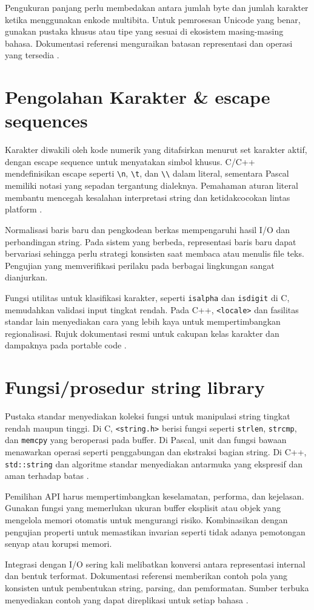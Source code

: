 \documentclass[../main.tex]{subfiles}
\begin{document}
Pengukuran panjang perlu membedakan antara jumlah byte dan jumlah karakter ketika menggunakan enkode multibita. Untuk pemrosesan Unicode yang benar, gunakan pustaka khusus atau tipe yang sesuai di ekosistem masing-masing bahasa. Dokumentasi referensi menguraikan batasan representasi dan operasi yang tersedia \parencite{cpp-strings,iso-c-draft-n1570}.

\section{Pengolahan Karakter \& escape sequences}
Karakter diwakili oleh kode numerik yang ditafsirkan menurut set karakter aktif, dengan escape sequence untuk menyatakan simbol khusus. C/C++ mendefinisikan escape seperti \texttt{\textbackslash n}, \texttt{\textbackslash t}, dan \texttt{\textbackslash\textbackslash} dalam literal, sementara Pascal memiliki notasi yang sepadan tergantung dialeknya. Pemahaman aturan literal membantu mencegah kesalahan interpretasi string dan ketidakcocokan lintas platform \parencite{iso-c-draft-n1570,free-pascal-docs}.

Normalisasi baris baru dan pengkodean berkas mempengaruhi hasil I/O dan perbandingan string. Pada sistem yang berbeda, representasi baris baru dapat bervariasi sehingga perlu strategi konsisten saat membaca atau menulis file teks. Pengujian yang memverifikasi perilaku pada berbagai lingkungan sangat dianjurkan.

Fungsi utilitas untuk klasifikasi karakter, seperti \texttt{isalpha} dan \texttt{isdigit} di C, memudahkan validasi input tingkat rendah. Pada C++, \texttt{<locale>} dan fasilitas standar lain menyediakan cara yang lebih kaya untuk mempertimbangkan regionalisasi. Rujuk dokumentasi resmi untuk cakupan kelas karakter dan dampaknya pada portable code \parencite{iso-c-draft-n1570,cpp-reference}.

\section{Fungsi/prosedur string library}
Pustaka standar menyediakan koleksi fungsi untuk manipulasi string tingkat rendah maupun tinggi. Di C, \texttt{<string.h>} berisi fungsi seperti \texttt{strlen}, \texttt{strcmp}, dan \texttt{memcpy} yang beroperasi pada buffer. Di Pascal, unit dan fungsi bawaan menawarkan operasi seperti penggabungan dan ekstraksi bagian string. Di C++, \texttt{std::string} dan algoritme standar menyediakan antarmuka yang ekspresif dan aman terhadap batas \parencite{c-strings-h,free-pascal-docs,cpp-strings}.

Pemilihan API harus mempertimbangkan keselamatan, performa, dan kejelasan. Gunakan fungsi yang memerlukan ukuran buffer eksplisit atau objek yang mengelola memori otomatis untuk mengurangi risiko. Kombinasikan dengan pengujian properti untuk memastikan invarian seperti tidak adanya pemotongan senyap atau korupsi memori.

Integrasi dengan I/O sering kali melibatkan konversi antara representasi internal dan bentuk terformat. Dokumentasi referensi memberikan contoh pola yang konsisten untuk pembentukan string, parsing, dan pemformatan. Sumber terbuka menyediakan contoh yang dapat direplikasi untuk setiap bahasa \parencite{c-strings-h,cpp-strings,free-pascal-docs}.
\end{document}
